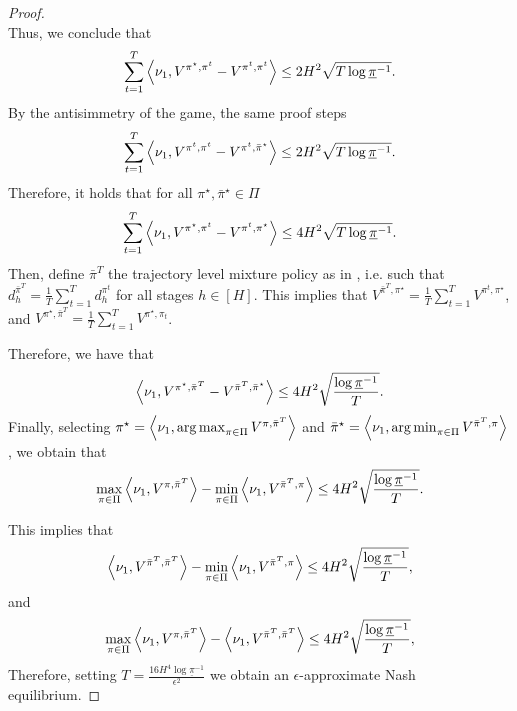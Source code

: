 \begin{proof}
\begin{equation*}
\end{equation*}
Thus, we conclude that
\begin{equation*}
\sum^T_{t=1}\left\langle{\nu_1},{V^{\pi^\star, \pi^t} -V^{\pi^t, \pi^t}}\right\rangle \leq 2 H^2\sqrt{ T \log \underline{\pi}^{-1}}.
\end{equation*}
By the antisimmetry of the game, the same proof steps 
\begin{equation*}
\sum^T_{t=1}\left\langle{\nu_1},{V^{\pi^t, \pi^t} - V^{\pi^t, \bar{\pi}^\star} }\right\rangle \leq 2 H^2\sqrt{ T \log \underline{\pi}^{-1}}.
\end{equation*}
Therefore, it holds that for all $\pi^\star, \bar{\pi}^\star \in \Pi$
\begin{equation*}
\sum^T_{t=1}\left\langle{\nu_1},{V^{\pi^\star, \pi^t} - V^{\pi^t, {\pi}^\star} }\right\rangle \leq 4 H^2\sqrt{ T \log \underline{\pi}^{-1}}.
\end{equation*}
Then, define $\bar{\pi}^T$ the trajectory level mixture policy as in \cite{swamyminimaximalist}, i.e. such that $d_h^{\bar{\pi}^T} = \frac{1}{T}\sum^T_{t=1} d_h^{\pi^t}$ for all stages $h \in [H]$. This implies that $V^{\bar{\pi}^T,\pi^\star} = \frac{1}{T}\sum^T_{t=1} V^{\pi^t,\pi^\star}$, and $V^{\pi^\star,\bar{\pi}^T} = \frac{1}{T}\sum^T_{t=1}V^{\pi^\star,\pi_t}$. 

Therefore, we have that
\begin{align*}
    \left\langle{\nu_1},{V^{\pi^\star, \bar{\pi}^T} - V^{\bar{\pi}^T, \bar{\pi}^\star} }\right\rangle \leq 4 H^2 \sqrt{\frac{   \log \underline{\pi}^{-1}}{T}}.
\end{align*}
Finally, selecting $\pi^\star = \left\langle{\nu_1},{\operatorname*{arg\,max}_{\pi\in\Pi} V^{\pi, \bar{\pi}^T}}\right\rangle$ and $\bar{\pi}^\star = \left\langle{\nu_1},{\operatorname*{arg\,min}_{\pi\in\Pi} V^{\bar{\pi}^T,\pi}}\right\rangle$, we obtain that
\begin{equation*}
\max_{\pi\in\Pi}\left\langle{\nu_1},{ V^{\pi, \bar{\pi}^T}}\right\rangle - \min_{\pi\in\Pi}\left\langle{\nu_1},{ V^{\bar{\pi}^T, \pi}}\right\rangle \leq 4 H^2 \sqrt{\frac{  \log \underline{\pi}^{-1}}{T}}.
\end{equation*}

This implies that
\begin{equation*}
\left\langle{\nu_1},{ V^{\bar{\pi}^T, \bar{\pi}^T}}\right\rangle - \min_{\pi\in\Pi}\left\langle{\nu_1},{ V^{\bar{\pi}^T, \pi}}\right\rangle \leq 4 H^2\sqrt{\frac{  \log \underline{\pi}^{-1}}{T}},
\end{equation*}
and
\begin{equation*}
\max_{\pi\in\Pi}\left\langle{\nu_1},{ V^{\pi, \bar{\pi}^T}}\right\rangle - \left\langle{\nu_1},{ V^{\bar{\pi}^T, \bar{\pi}^T}}\right\rangle \leq 4 H^2 \sqrt{\frac{ \log \underline{\pi}^{-1}}{T}},
\end{equation*}
Therefore, setting $T = \frac{16 H^4 \log\underline{\pi}^{-1}}{ \epsilon^2}$ we obtain an $\epsilon$-approximate Nash equilibrium.
\end{proof}
